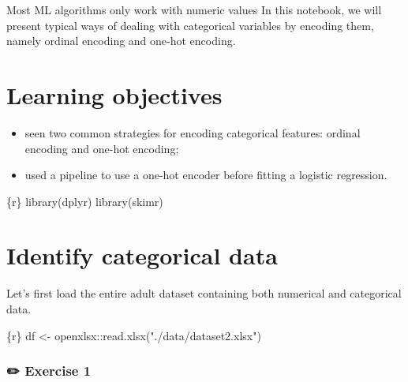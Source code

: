 \documentclass[
  letterpaper,
  DIV=11,
  numbers=noendperiod,
  oneside]{scrreprt}
\newenvironment{Shaded}{\begin{snugshade}}{\end{snugshade}}
\newcommand{\FunctionTok}[1]{\textcolor[rgb]{0.28,0.35,0.67}{#1}}
\newcommand{\InformationTok}[1]{\textcolor[rgb]{0.37,0.37,0.37}{#1}}
\newcommand{\NormalTok}[1]{\textcolor[rgb]{0.00,0.23,0.31}{#1}}
\newcommand{\OtherTok}[1]{\textcolor[rgb]{0.00,0.23,0.31}{#1}}
\newcommand{\SpecialCharTok}[1]{\textcolor[rgb]{0.37,0.37,0.37}{#1}}
\newcommand{\StringTok}[1]{\textcolor[rgb]{0.13,0.47,0.30}{#1}}
\providecommand{\tightlist}{%
  \setlength{\itemsep}{0pt}\setlength{\parskip}{0pt}}\usepackage{longtable,booktabs,array}
\begin{document}
Most ML algorithms only work with numeric values In this notebook, we
will present typical ways of dealing with categorical variables by
encoding them, namely ordinal encoding and one-hot encoding.

\hypertarget{learning-objectives-11}{%
\section{Learning objectives}\label{learning-objectives-11}}

\begin{itemize}
\tightlist
\item
  seen two common strategies for encoding categorical features: ordinal
  encoding and one-hot encoding;
\item
  used a pipeline to use a one-hot encoder before fitting a logistic
  regression.
\end{itemize}

\begin{Shaded}
\begin{Highlighting}[]
\InformationTok{\textasciigrave{}\textasciigrave{}\textasciigrave{}\{r\}}
\FunctionTok{library}\NormalTok{(dplyr)}
\FunctionTok{library}\NormalTok{(skimr)}
\InformationTok{\textasciigrave{}\textasciigrave{}\textasciigrave{}}
\end{Highlighting}
\end{Shaded}

\hypertarget{identify-categorical-data}{%
\section{Identify categorical data}\label{identify-categorical-data}}

Let's first load the entire adult dataset containing both numerical and
categorical data.

\begin{Shaded}
\begin{Highlighting}[]
\InformationTok{\textasciigrave{}\textasciigrave{}\textasciigrave{}\{r\}}
\NormalTok{df }\OtherTok{\textless{}{-}}\NormalTok{ openxlsx}\SpecialCharTok{::}\FunctionTok{read.xlsx}\NormalTok{(}\StringTok{"./data/dataset2.xlsx"}\NormalTok{)}
\InformationTok{\textasciigrave{}\textasciigrave{}\textasciigrave{}}
\end{Highlighting}
\end{Shaded}

\subsubsection{\texorpdfstring{{✏️} Exercise 1}{✏️ Exercise 1}}
\end{document}
